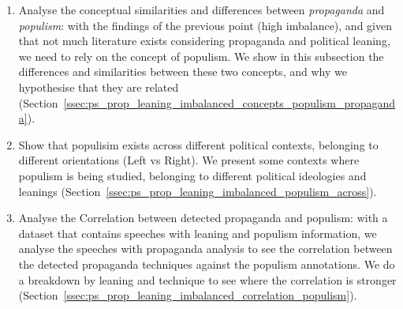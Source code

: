 \begin{enumerate}
    \item Analyse the conceptual similarities and differences  between \textit{propaganda} and \textit{populism}: with the findings of the previous point (high imbalance), and given that not much literature exists considering propaganda and political leaning, we need to rely on the concept of populism. %
          We show in this subsection the differences and similarities between these two concepts, and why we hypothesise that they are related (Section~\ref{ssec:ps_prop_leaning_imbalanced_concepts_populism_propaganda}).
    \item Show that populisim exists across different political contexts, belonging to different orientations (Left vs Right).
          We present some contexts where populism is being studied, belonging to different political ideologies and leanings (Section~\ref{ssec:ps_prop_leaning_imbalanced_populism_across}).
    \item Analyse the Correlation between detected propaganda and populism: with a dataset that contains speeches with leaning and populism information, we analyse the speeches with propaganda analysis to see the correlation between the detected propaganda techniques against the populism annotations. We do a breakdown by leaning and technique to see where the correlation is stronger (Section~\ref{ssec:ps_prop_leaning_imbalanced_correlation_populism}).
\end{enumerate}





